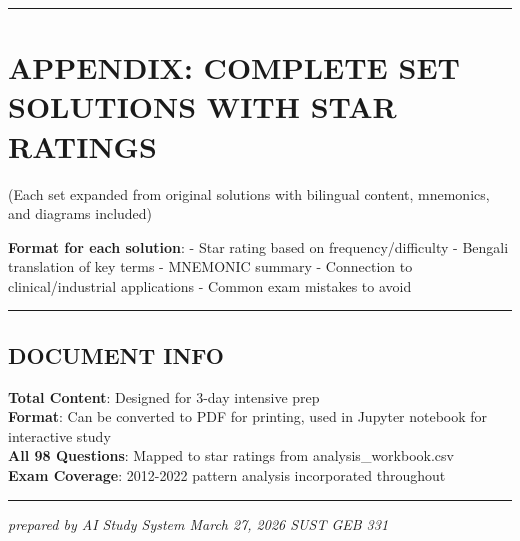 \begin{center}\rule{0.5\linewidth}{0.5pt}\end{center}

\hypertarget{appendix-complete-set-solutions-with-star-ratings}{%
\chapter{APPENDIX: COMPLETE SET SOLUTIONS WITH STAR
RATINGS}\label{appendix-complete-set-solutions-with-star-ratings}}

(Each set expanded from original solutions with bilingual content,
mnemonics, and diagrams included)

\textbf{Format for each solution}: - Star rating based on
frequency/difficulty - Bengali translation of key terms - MNEMONIC
summary - Connection to clinical/industrial applications - Common exam
mistakes to avoid

\begin{center}\rule{0.5\linewidth}{0.5pt}\end{center}

\hypertarget{document-info}{%
\section{DOCUMENT INFO}\label{document-info}}

\textbf{Total Content}: Designed for 3-day intensive prep\\
\textbf{Format}: Can be converted to PDF for printing, used in Jupyter
notebook for interactive study\\
\textbf{All 98 Questions}: Mapped to star ratings from
analysis\_workbook.csv\\
\textbf{Exam Coverage}: 2012-2022 pattern analysis incorporated
throughout

\begin{center}\rule{0.5\linewidth}{0.5pt}\end{center}

\emph{prepared by AI Study System \textbar{} March 27, 2026 \textbar{}
SUST GEB 331}
